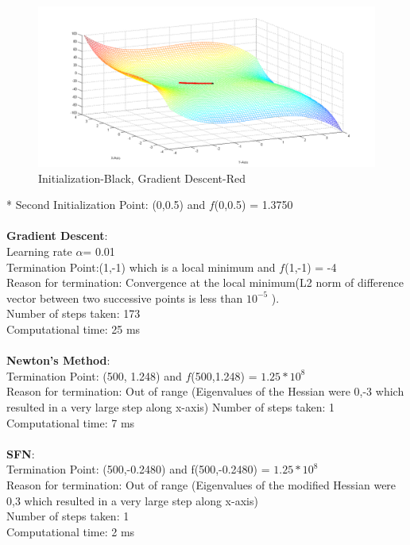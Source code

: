 \newpage

\begin{figure}[H]
\includegraphics[scale = 0.5]{3.png}
\caption{Initialization-Black, Gradient Descent-Red}
\end{figure}

* Second Initialization Point: (0,0.5) and $f$(0,0.5) = 1.3750
\\\\
\textbf{Gradient Descent}: 
\\Learning rate $\alpha$= 0.01
\\Termination Point:(1,-1) which is a local minimum and $f$(1,-1) = -4
\\Reason for termination: Convergence at the local minimum(L2 norm of difference vector between two successive points is less than $10^{-5}$ ).
\\Number of steps taken: 173
\\Computational time: 25 ms
\\\\
\textbf{Newton’s Method}: 
\\Termination Point: (500, 1.248) and $f$(500,1.248) = $1.25*10^8$
\\Reason for termination: Out of range (Eigenvalues of the Hessian were 0,-3 which resulted in a very large step along x-axis)
Number of steps taken: 1
Computational time: 7 ms
\\\\
\textbf{SFN}: 
\\ Termination Point: (500,-0.2480) and f(500,-0.2480) = $1.25*10^8$
\\ Reason for termination: Out of range (Eigenvalues of the modified Hessian were 0,3 which resulted in a very large step along x-axis)
\\ Number of steps taken: 1
\\ Computational time: 2 ms


